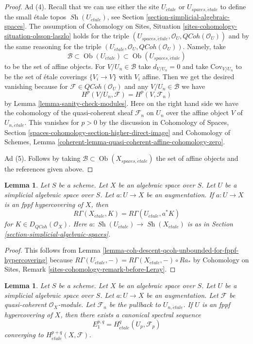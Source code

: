 \documentclass{stacks-project}
\theoremstyle{plain}
\newtheorem{lemma}[subsection]{Lemma}
\theoremstyle{definition}
\theoremstyle{remark}
\numberwithin{equation}{subsection}
\def\Ob{\mathop{\mathrm{Ob}}\nolimits}
\def\Sh{\mathop{\mathit{Sh}}\nolimits}
\def\etale{{\acute{e}tale}}
\def\QCoh{\mathit{QCoh}}
\begin{document}
\begin{proof}
\medskip\noindent
Ad (4). Recall that we can use either the site $U_\etale$ or
$U_{spaces, \etale}$ to define the small \'etale topos
$\Sh(U_\etale)$, see Section \ref{section-simplicial-algebraic-spaces}.
The assumption of
Cohomology on Sites, Situation \ref{sites-cohomology-situation-olsson-laszlo}
holds for the triple
$(U_{spaces, \etale}, \mathcal{O}_U, \QCoh(\mathcal{O}_U))$
and by the same reasoning for the triple
$(U_\etale, \mathcal{O}_U, \QCoh(\mathcal{O}_U))$.
Namely, take
$$
\mathcal{B} \subset \Ob(U_\etale) \subset \Ob(U_{spaces, \etale})
$$
to be the set of affine objects. For $V/U_n \in \mathcal{B}$
take $d_{V/U_n} = 0$ and take $\text{Cov}_{V/U_n}$ to be the set of
\'etale coverings $\{V_i \to V\}$ with $V_i$ affine.
Then we get the desired vanishing because for
$\mathcal{F} \in \QCoh(\mathcal{O}_U)$
and any $V/U_n \in \mathcal{B}$ we have
$$
H^p(V/U_n, \mathcal{F}) = H^p(V, \mathcal{F}_n)
$$
by Lemma \ref{lemma-sanity-check-modules}. Here on the
right hand side we have the cohomology of the quasi-coherent
sheaf $\mathcal{F}_n$ on $U_n$ over the affine object $V$
of $U_{n, \etale}$. This vanishes for $p > 0$ by the discussion in
Cohomology of Spaces, Section
\ref{spaces-cohomology-section-higher-direct-image} and
Cohomology of Schemes, Lemma
\ref{coherent-lemma-quasi-coherent-affine-cohomology-zero}.

\medskip\noindent
Ad (5). Follows by taking $\mathcal{B} \subset \Ob(X_{spaces, \etale})$
the set of affine objects and the references given above.
\end{proof}

\begin{lemma}
\label{lemma-compute-via-fppf-hypercovering-modules}
Let $S$ be a scheme. Let $X$ be an algebraic space over $S$.
Let $U$ be a simplicial algebraic space over $S$. Let $a : U \to X$
be an augmentation. If $a : U \to X$ is an fppf hypercovering of $X$, then
$$
R\Gamma(X_\etale, K) = R\Gamma(U_\etale, a^*K)
$$
for $K \in D_\QCoh(\mathcal{O}_X)$. Here $a : \Sh(U_\etale) \to \Sh(X_\etale)$
is as in Section \ref{section-simplicial-algebraic-spaces}.
\end{lemma}

\begin{proof}
This follows from
Lemma \ref{lemma-coh-descent-qcoh-unbounded-for-fppf-hypercovering}
because $R\Gamma(U_\etale, -) = R\Gamma(X_\etale, -) \circ Ra_*$ by
Cohomology on Sites, Remark \ref{sites-cohomology-remark-before-Leray}.
\end{proof}

\begin{lemma}
\label{lemma-spectral-sequence-fppf-hypercovering-modules}
Let $S$ be a scheme. Let $X$ be an algebraic space over $S$.
Let $U$ be a simplicial algebraic space over $S$. Let $a : U \to X$
be an augmentation. Let $\mathcal{F}$ be quasi-coherent
$\mathcal{O}_X$-module. Let $\mathcal{F}_n$ be the pullback to
$U_{n, \etale}$. If $U$ is an fppf hypercovering of $X$, then
there exists a canonical spectral sequence
$$
E_1^{p, q} = H^q_\etale(U_p, \mathcal{F}_p)
$$
converging to $H^{p + q}_\etale(X, \mathcal{F})$.
\end{lemma}
\end{document}
